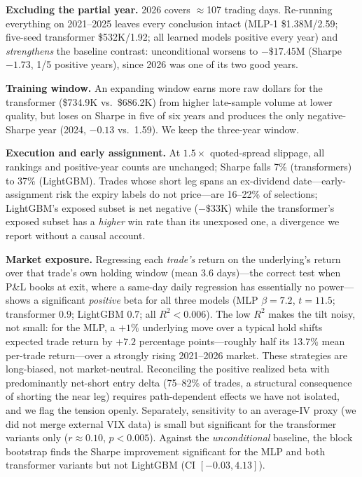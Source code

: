 \documentclass[sigconf,review]{acmart}
\begin{document}
\noindent\textbf{Excluding the partial year.} 2026 covers $\approx$107 trading days. Re-running everything on 2021--2025 leaves every conclusion intact (MLP-1 \$1.38M/2.59; five-seed transformer \$532K/1.92; all learned models positive every year) and \emph{strengthens} the baseline contrast: unconditional worsens to $-\$17.45$M (Sharpe $-1.73$, 1/5 positive years), since 2026 was one of its two good years.

\noindent\textbf{Training window.} An expanding window earns more raw dollars for the transformer (\$734.9K vs.\ \$686.2K) from higher late-sample volume at lower quality, but loses on Sharpe in five of six years and produces the only negative-Sharpe year (2024, $-0.13$ vs.\ 1.59). We keep the three-year window.

\noindent\textbf{Execution and early assignment.} At $1.5\times$ quoted-spread slippage, all rankings and positive-year counts are unchanged; Sharpe falls 7\% (transformers) to 37\% (LightGBM). Trades whose short leg spans an ex-dividend date---early-assignment risk the expiry labels do not price---are 16--22\% of selections; LightGBM's exposed subset is net negative ($-\$33$K) while the transformer's exposed subset has a \emph{higher} win rate than its unexposed one, a divergence we report without a causal account.

\noindent\textbf{Market exposure.} Regressing each \emph{trade's} return on the underlying's return over that trade's own holding window (mean 3.6 days)---the correct test when P\&L books at exit, where a same-day daily regression has essentially no power---shows a significant \emph{positive} beta for all three models (MLP $\beta=7.2$, $t=11.5$; transformer $0.9$; LightGBM $0.7$; all $R^2<0.006$). The low $R^2$ makes the tilt noisy, not small: for the MLP, a $+1\%$ underlying move over a typical hold shifts expected trade return by $+7.2$ percentage points---roughly half its 13.7\% mean per-trade return---over a strongly rising 2021--2026 market. These strategies are long-biased, not market-neutral. Reconciling the positive realized beta with predominantly net-short entry delta (75--82\% of trades, a structural consequence of shorting the near leg) requires path-dependent effects we have not isolated, and we flag the tension openly. Separately, sensitivity to an average-IV proxy (we did not merge external VIX data) is small but significant for the transformer variants only ($r\approx0.10$, $p<0.005$). Against the \emph{unconditional} baseline, the block bootstrap finds the Sharpe improvement significant for the MLP and both transformer variants but not LightGBM (CI $[-0.03,4.13]$).
\end{document}
